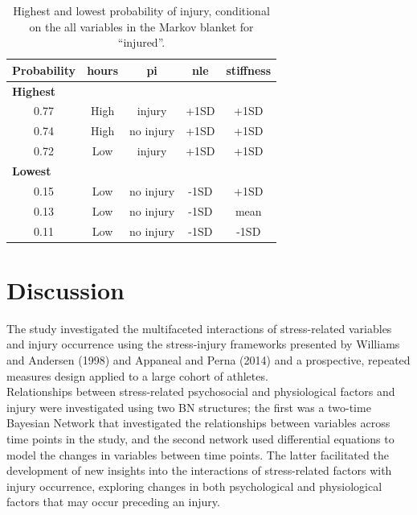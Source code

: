 \documentclass[
  english,
  man]{apa6}
\begin{document}
\begin{table}[H]

\caption{\label{tab:table11}Highest and lowest probability of injury, conditional on the all variables in the Markov blanket for ``injured''.}
\centering
\begin{tabular}[t]{c|c|c|c|c}
\hline
\textbf{Probability} & \textbf{hours} & \textbf{pi} & \textbf{nle} & \textbf{stiffness}\\
\hline
\multicolumn{5}{l}{\textbf{Highest}}\\
\hline
\hspace{1em}0.77 & High & injury & +1SD & +1SD\\
\hline
\hspace{1em}0.74 & High & no injury & +1SD & +1SD\\
\hline
\hspace{1em}0.72 & Low & injury & +1SD & +1SD\\
\hline
\multicolumn{5}{l}{\textbf{Lowest}}\\
\hline
\hspace{1em}0.15 & Low & no injury & -1SD & +1SD\\
\hline
\hspace{1em}0.13 & Low & no injury & -1SD & mean\\
\hline
\hspace{1em}0.11 & Low & no injury & -1SD & -1SD\\
\hline
\end{tabular}
\end{table}

\hypertarget{discussion}{%
\section{Discussion}\label{discussion}}

The study investigated the multifaceted interactions of stress-related variables and injury occurrence using the stress-injury frameworks presented by Williams and Andersen (1998) and Appaneal and Perna (2014) and a prospective, repeated measures design applied to a large cohort of athletes.\\
Relationships between stress-related psychosocial and physiological factors and injury were investigated using two BN structures; the first was a two-time Bayesian Network that investigated the relationships between variables across time points in the study, and the second network used differential equations to model the changes in variables between time points.
The latter facilitated the development of new insights into the interactions of stress-related factors with injury occurrence, exploring changes in both psychological and physiological factors that may occur preceding an injury.
\end{document}
